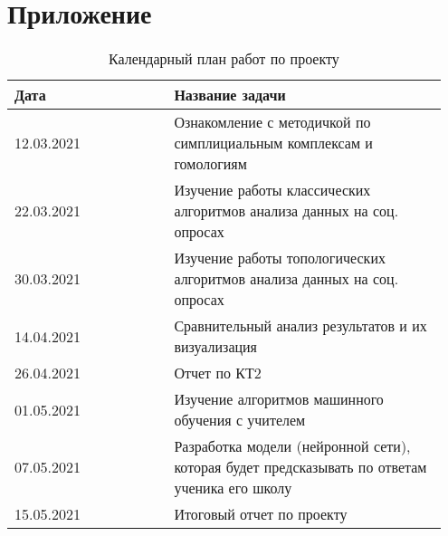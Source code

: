 \section{Приложение}

\begin{table}[h]
\centering
\caption{Календарный план работ по проекту}
\label{tab:project-plan}
\begin{tabular}{|p{0.35\linewidth}|p{0.6\linewidth}|}
\hline
Дата       & Название задачи                                                          \\ \hline
12.03.2021 & Ознакомление с методичкой по симплициальным комплексам и гомологиям      \\ \hline
22.03.2021 & Изучение работы классических алгоритмов анализа данных на соц. опросах   \\ \hline
30.03.2021 & Изучение работы топологических алгоритмов анализа данных на соц. опросах \\ \hline
14.04.2021 & Сравнительный анализ результатов и их визуализация                       \\ \hline
26.04.2021 & Отчет по КТ2                                                             \\ \hline
01.05.2021 & Изучение алгоритмов машинного обучения с учителем                        \\ \hline
07.05.2021 & Разработка модели (нейронной сети), которая будет предсказывать по ответам ученика его школу \\ \hline
15.05.2021 & Итоговый отчет по проекту                                                \\ \hline
\end{tabular}
\end{table}